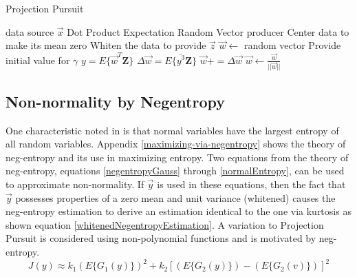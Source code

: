 \documentclass[11pt]{article}
\begin{document}



\begin{algorithm}
\caption{Projection Pursuit}
\label{alg:Projection-Pursuit}
\begin{algorithmic}
	\REQUIRE data source $\vec{x}$
	\REQUIRE Dot Product Expectation
	\REQUIRE Random Vector producer
	\STATE Center data to make its mean zero
	\STATE Whiten the data to provide $\vec{z}$
	\STATE $\vec{w} \leftarrow$ random vector
	\STATE Provide initial value for $\gamma$
	\REPEAT
		\STATE $y = E \{\vec{w}^T \mathbf{Z} \}$
		\STATE $ \Delta \vec{w} = E \{ \bar {y^3} \mathbf{Z}  \}   $
		\STATE $\vec{w} += \Delta \vec{w} $
		\STATE $\vec{w} \leftarrow \frac{\vec{w}}{||\vec{w}||}$
\end{algorithmic}
\end{algorithm}



\subsection{Non-normality by Negentropy}
One characteristic noted in 
\cite[94]{appo-ica-book} is that normal variables have the largest entropy of all random variables.  Appendix \ref{maximizing-via-negentropy} shows the theory of neg-entropy and its use in maximizing entropy. Two equations from the theory of neg-entropy, equations \ref{negentropyGauss} through \ref{normalEntropy}, can be used to approximate non-normality.  If $\vec{y}$ is used in these equations, then the fact that $\vec{y}$ possesses properties of a zero mean and unit variance (whitened) %
causes the neg-entropy estimation to derive an estimation identical to the one via kurtosis as shown equation \ref{whitenedNegentropyEstimation}.  A variation to Projection Pursuit is considered using non-polynomial functions and is motivated by neg-entropy.
\begin{equation}
J(y) \approx k_1 ( E\{ G_1 (y)\} )^2 + k_2 [(E \{G_2 (y)\}) - (E \{G_2 (v)\}) ]^2 \label{whitenedNegentropyEstimation}
\end{equation}
\end{document}
